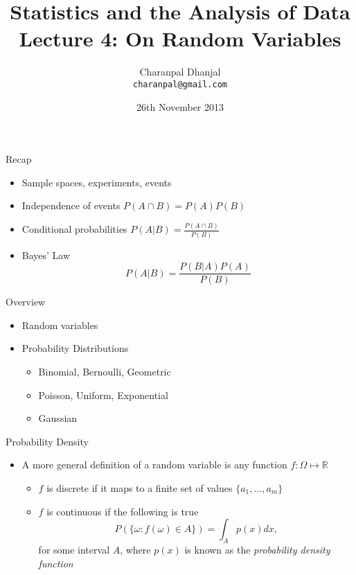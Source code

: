 \documentclass{beamer}
\title{Statistics and the Analysis of Data\\ Lecture 4: On Random Variables}
\author{Charanpal Dhanjal \\ \texttt{charanpal@gmail.com}}
\institute{\'{E}cole des Ponts}
\date{26th November 2013}
\begin{document}
\frame{\titlepage}


\begin{frame}{Recap}  
\begin{itemize} 
\item Sample spaces, experiments, events 
\item Independence of events   $P(A \cap B) = P(A)P(B)$
\item Conditional probabilities  $P(A | B) = \frac{P(A \cap B)}{P(B)}$
\item Bayes' Law 
\begin{displaymath}
 P(A | B) = \frac{P(B | A)P(A)}{P(B)}
\end{displaymath}
\end{itemize}
\end{frame}

\begin{frame}{Overview}
\begin{itemize} 
\item Random variables 
\item Probability Distributions
\begin{itemize}
\item Binomial, Bernoulli, Geometric 
\item Poisson, Uniform, Exponential 
\item Gaussian  
\end{itemize}  
\end{itemize}
\end{frame}

\begin{frame}{Probability Density} 
\begin{itemize} 
 \item A more general definition of a random variable is any function $f: \Omega \mapsto \mathbb{R}$ 
\begin{itemize} 
\item $f$ is discrete if it maps to a finite set of values $\{a_1, \ldots, a_m\}$
\item $f$ is continuous if the following is true 
\begin{displaymath} 
P(\{\omega: f(\omega) \in A\}) = \int_{A} p(x) dx, 
\end{displaymath}
for some interval $A$, where $p(x)$ is known as the \emph{probability density function} 
 \end{itemize}
 \end{itemize}
\end{frame}
\end{document}
